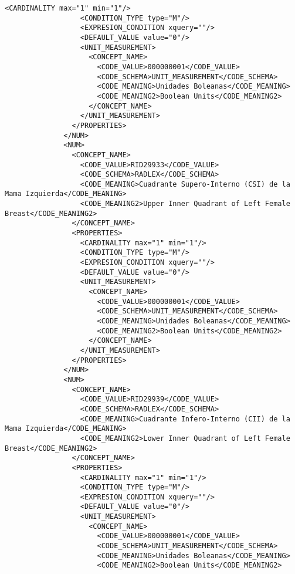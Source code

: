 \begin{lstlisting}[label=some-code,caption=Some Code]
                  <CARDINALITY max="1" min="1"/>
                  <CONDITION_TYPE type="M"/>
                  <EXPRESION_CONDITION xquery=""/>
                  <DEFAULT_VALUE value="0"/>
                  <UNIT_MEASUREMENT>
                    <CONCEPT_NAME>
                      <CODE_VALUE>000000001</CODE_VALUE>
                      <CODE_SCHEMA>UNIT_MEASUREMENT</CODE_SCHEMA>
                      <CODE_MEANING>Unidades Boleanas</CODE_MEANING>
                      <CODE_MEANING2>Boolean Units</CODE_MEANING2>
                    </CONCEPT_NAME>
                  </UNIT_MEASUREMENT>
                </PROPERTIES>
              </NUM>
              <NUM>
                <CONCEPT_NAME>
                  <CODE_VALUE>RID29933</CODE_VALUE>
                  <CODE_SCHEMA>RADLEX</CODE_SCHEMA>
                  <CODE_MEANING>Cuadrante Supero-Interno (CSI) de la Mama Izquierda</CODE_MEANING>
                  <CODE_MEANING2>Upper Inner Quadrant of Left Female Breast</CODE_MEANING2>
                </CONCEPT_NAME>
                <PROPERTIES>
                  <CARDINALITY max="1" min="1"/>
                  <CONDITION_TYPE type="M"/>
                  <EXPRESION_CONDITION xquery=""/>
                  <DEFAULT_VALUE value="0"/>
                  <UNIT_MEASUREMENT>
                    <CONCEPT_NAME>
                      <CODE_VALUE>000000001</CODE_VALUE>
                      <CODE_SCHEMA>UNIT_MEASUREMENT</CODE_SCHEMA>
                      <CODE_MEANING>Unidades Boleanas</CODE_MEANING>
                      <CODE_MEANING2>Boolean Units</CODE_MEANING2>
                    </CONCEPT_NAME>
                  </UNIT_MEASUREMENT>
                </PROPERTIES>
              </NUM>
              <NUM>
                <CONCEPT_NAME>
                  <CODE_VALUE>RID29939</CODE_VALUE>
                  <CODE_SCHEMA>RADLEX</CODE_SCHEMA>
                  <CODE_MEANING>Cuadrante Infero-Interno (CII) de la Mama Izquierda</CODE_MEANING>
                  <CODE_MEANING2>Lower Inner Quadrant of Left Female Breast</CODE_MEANING2>
                </CONCEPT_NAME>
                <PROPERTIES>
                  <CARDINALITY max="1" min="1"/>
                  <CONDITION_TYPE type="M"/>
                  <EXPRESION_CONDITION xquery=""/>
                  <DEFAULT_VALUE value="0"/>
                  <UNIT_MEASUREMENT>
                    <CONCEPT_NAME>
                      <CODE_VALUE>000000001</CODE_VALUE>
                      <CODE_SCHEMA>UNIT_MEASUREMENT</CODE_SCHEMA>
                      <CODE_MEANING>Unidades Boleanas</CODE_MEANING>
                      <CODE_MEANING2>Boolean Units</CODE_MEANING2>

\end{lstlisting}
